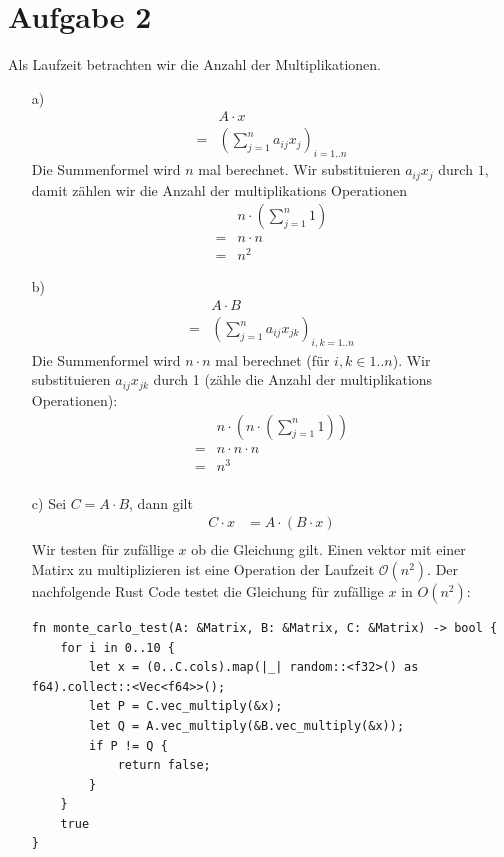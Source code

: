 \documentclass[a4paper]{scrartcl}
\begin{document}
\section*{Aufgabe 2}
Als Laufzeit betrachten wir die Anzahl der Multiplikationen.\\
\begin{enumerate}
\item [a)] 
\begin{align}
&A \cdot x\\
= &\left(\sum_{j=1}^{n} a_{ij}x_j\right)_{i=1..n}
\end{align}
Die Summenformel wird $ n $ mal berechnet. 
Wir substituieren $a_{ij}x_j$ durch $1$, damit zählen wir die Anzahl der multiplikations Operationen
\begin{align}
&n\cdot\left(\sum_{j=1}^{n} 1\right)\\
= &n\cdot n\\
= &n^2
\end{align}

\item [b)]
\begin{align}
&A \cdot B\\
= &\left(\sum_{j=1}^{n} a_{ij}x_{jk}\right)_{i,k=1..n}
\end{align}
Die Summenformel wird $ n \cdot n $ mal berechnet (für $i,k \in 1..n$).
Wir substituieren $a_{ij}x_{jk}$ durch 1 (zähle die Anzahl der multiplikations Operationen):
\begin{align}
&n\cdot\left(n\cdot\left(\sum_{j=1}^{n} 1\right)\right)\\
= &n\cdot n\cdot n\\
= &n^3\\
\end{align}
\item [c)]
Sei $ C = A \cdot B $, dann gilt 
\begin{align*}
	C \cdot x &= A \cdot (B \cdot x)\\
\end{align*}
Wir testen für zufällige $x$ ob die Gleichung gilt. Einen vektor mit einer Matirx zu multiplizieren ist eine Operation der Laufzeit $\mathcal{O}(n^2)$.
Der nachfolgende Rust Code testet die Gleichung für zufällige $x$ in $O(n^2)$:
\begin{lstlisting}
fn monte_carlo_test(A: &Matrix, B: &Matrix, C: &Matrix) -> bool {
	for i in 0..10 {
		let x = (0..C.cols).map(|_| random::<f32>() as f64).collect::<Vec<f64>>();
		let P = C.vec_multiply(&x);
		let Q = A.vec_multiply(&B.vec_multiply(&x));
		if P != Q {
			return false;
		}
	}
	true
}
\end{lstlisting}

\end{enumerate}
\end{document}
